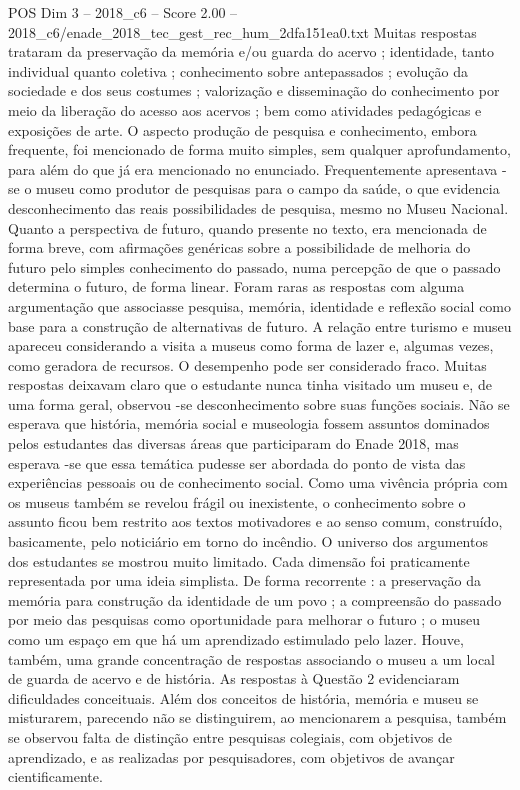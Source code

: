 \begin{textsample}{POS Dim 3 – 2018\_c6 – Score 2.00 – 2018\_c6/enade\_2018\_tec\_gest\_rec\_hum\_2dfa151ea0.txt}
Muitas respostas trataram da preservação da memória e/ou guarda do acervo ; identidade, tanto individual quanto coletiva ; conhecimento sobre antepassados ; evolução da sociedade e dos seus costumes ; valorização e disseminação do conhecimento por meio da liberação do acesso aos acervos ; bem como atividades pedagógicas e exposições de arte.
O aspecto produção de pesquisa e conhecimento, embora frequente, foi mencionado de forma muito simples, sem qualquer aprofundamento, para além do que já era mencionado no enunciado.
Frequentemente apresentava -se o museu como produtor de pesquisas para o campo da saúde, o que evidencia desconhecimento das reais possibilidades de pesquisa, mesmo no Museu Nacional.
Quanto a perspectiva de futuro, quando presente no texto, era mencionada de forma breve, com afirmações genéricas sobre a possibilidade de melhoria do futuro pelo simples conhecimento do passado, numa percepção de que o passado determina o futuro, de forma linear.
Foram raras as respostas com alguma argumentação que associasse pesquisa, memória, identidade e reflexão social como base para a construção de alternativas de futuro.
A relação entre turismo e museu apareceu considerando a visita a museus como forma de lazer e, algumas vezes, como geradora de recursos.
O desempenho pode ser considerado fraco.
Muitas respostas deixavam claro que o estudante nunca tinha visitado um museu e, de uma forma geral, observou -se desconhecimento sobre suas funções sociais.
Não se esperava que história, memória social e museologia fossem assuntos dominados pelos estudantes das diversas áreas que participaram do Enade 2018, mas esperava -se que essa temática pudesse ser abordada do ponto de vista das experiências pessoais ou de conhecimento social.
Como uma vivência própria com os museus também se revelou frágil ou inexistente, o conhecimento sobre o assunto ficou bem restrito aos textos motivadores e ao senso comum, construído, basicamente, pelo noticiário em torno do incêndio.
O universo dos argumentos dos estudantes se mostrou muito limitado.
Cada dimensão foi praticamente representada por uma ideia simplista.
De forma recorrente : a preservação da memória para construção da identidade de um povo ; a compreensão do passado por meio das pesquisas como oportunidade para melhorar o futuro ; o museu como um espaço em que há um aprendizado estimulado pelo lazer.
Houve, também, uma grande concentração de respostas associando o museu a um local de guarda de acervo e de história.
As respostas à Questão 2 evidenciaram dificuldades conceituais.
Além dos conceitos de história, memória e museu se misturarem, parecendo não se distinguirem, ao mencionarem a pesquisa, também se observou falta de distinção entre pesquisas colegiais, com objetivos de aprendizado, e as realizadas por pesquisadores, com objetivos de avançar cientificamente.

\end{textsample}
